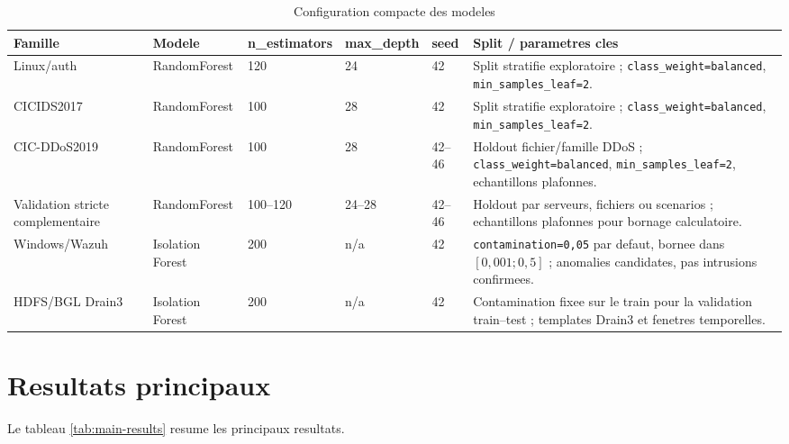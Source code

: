 \begin{table}[H]
\centering
\caption{Configuration compacte des modeles}
\label{tab:model-config}
\scriptsize
\begin{tabularx}{\textwidth}{p{2.4cm}p{2.4cm}p{2.2cm}p{2.2cm}p{2cm}X}
\toprule
\textbf{Famille} & \textbf{Modele} & \textbf{n\_estimators} & \textbf{max\_depth} & \textbf{seed} & \textbf{Split / parametres cles} \\
\midrule
Linux/auth & RandomForest & 120 & 24 & 42 & Split stratifie exploratoire ; \texttt{class\_weight=balanced}, \texttt{min\_samples\_leaf=2}. \\
CICIDS2017 & RandomForest & 100 & 28 & 42 & Split stratifie exploratoire ; \texttt{class\_weight=balanced}, \texttt{min\_samples\_leaf=2}. \\
CIC-DDoS2019 & RandomForest & 100 & 28 & 42--46 & Holdout fichier/famille DDoS ; \texttt{class\_weight=balanced}, \texttt{min\_samples\_leaf=2}, echantillons plafonnes. \\
Validation stricte complementaire & RandomForest & 100--120 & 24--28 & 42--46 & Holdout par serveurs, fichiers ou scenarios ; echantillons plafonnes pour bornage calculatoire. \\
Windows/Wazuh & Isolation Forest & 200 & n/a & 42 & \texttt{contamination=0,05} par defaut, bornee dans $[0,001;0,5]$ ; anomalies candidates, pas intrusions confirmees. \\
HDFS/BGL Drain3 & Isolation Forest & 200 & n/a & 42 & Contamination fixee sur le train pour la validation train--test ; templates Drain3 et fenetres temporelles. \\
\bottomrule
\end{tabularx}
\end{table}

\section{Resultats principaux}
Le tableau \ref{tab:main-results} resume les principaux resultats.

